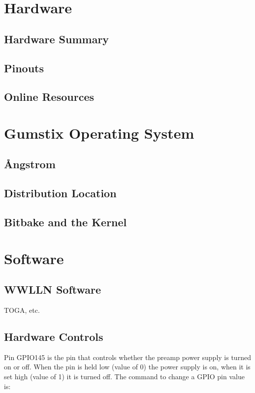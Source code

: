 \section{Hardware}

\subsection{Hardware Summary}

\subsection{Pinouts}

\subsection{Online Resources}

\section{Gumstix Operating System}

\subsection{\r{A}ngstrom}

\subsection{Distribution Location}

\subsection{Bitbake and the Kernel}

\section{Software}

\subsection{WWLLN Software}

TOGA, etc.

\subsection{Hardware Controls}

Pin GPIO145 is the pin that controls whether the preamp power supply is turned on or off.
When the pin is held low (value of 0) the power supply is on, when it is set high (value of 1) it is turned off.
The command to change a GPIO pin value is:

